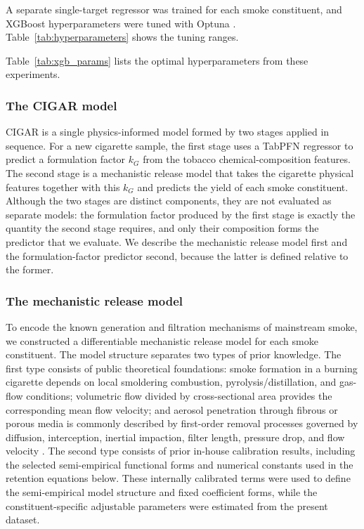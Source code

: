 \documentclass[11pt]{article}
\begin{document}
A separate single-target regressor was trained for each smoke constituent, and
XGBoost hyperparameters were tuned with Optuna \cite{akiba2019optuna}.
Table~\ref{tab:hyperparameters} shows the tuning ranges.



Table~\ref{tab:xgb_params} lists the optimal hyperparameters from these experiments.




\subsubsection*{The CIGAR model}

CIGAR is a single physics-informed model formed by two stages applied in
sequence. For a new cigarette sample, the first stage uses a TabPFN regressor
to predict a formulation factor $k_G$ from the tobacco chemical-composition
features. The second stage is a mechanistic release model that takes the
cigarette physical features together with this $k_G$ and predicts the yield of
each smoke constituent. Although the two stages are distinct components, they
are not evaluated as separate models: the formulation factor produced by the
first stage is exactly the quantity the second stage requires, and only their
composition forms the predictor that we evaluate. We describe the mechanistic release model first and the
formulation-factor predictor second, because the latter is defined relative to
the former.

\subsubsection*{The mechanistic release model}

To encode the known generation and filtration mechanisms of mainstream smoke, we constructed a differentiable mechanistic release model for each smoke constituent. The model structure separates two types of prior knowledge. The first type consists of public theoretical foundations: smoke formation in a burning cigarette depends on local smoldering combustion, pyrolysis/distillation, and gas-flow conditions; volumetric flow divided by cross-sectional area provides the corresponding mean flow velocity; and aerosol penetration through fibrous or porous media is commonly described by first-order removal processes governed by diffusion, interception, inertial impaction, filter length, pressure drop, and flow velocity \cite{torero2020smouldering,liu2020particulate,xu2020airfiltering}. The second type consists of prior in-house calibration results, including the selected semi-empirical functional forms and numerical constants used in the retention equations below. These internally calibrated terms were used to define the semi-empirical model structure and fixed coefficient forms, while the constituent-specific adjustable parameters were estimated from the present dataset.
\end{document}

